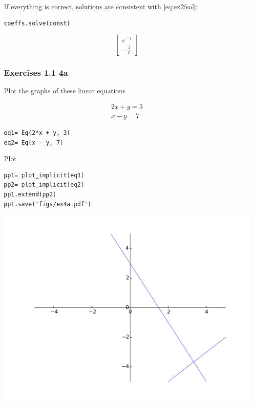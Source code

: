 If everything is correct, solutions are consistent with \ref{eq:ex2fsol}:

\begin{verbatim}
coeffs.solve(const)
\end{verbatim}

\begin{equation}
\left[\begin{matrix}e^{-1}\\- \frac{1}{e}\end{matrix}\right]
\end{equation}

\subsubsection{Exercises 1.1 4a}
Plot the graphs of these linear equations

\begin{equation}
\begin{matrix}2 x + y = 3\\x - y = 7\end{matrix}
\end{equation}

\begin{verbatim}
eq1= Eq(2*x + y, 3)
eq2= Eq(x - y, 7)
\end{verbatim}

Plot

\begin{verbatim}
pp1= plot_implicit(eq1)
pp2= plot_implicit(eq2)
pp1.extend(pp2)
pp1.save('figs/ex4a.pdf')
\end{verbatim}

\includegraphics[width=\linewidth]{figs/ex4a.pdf}

